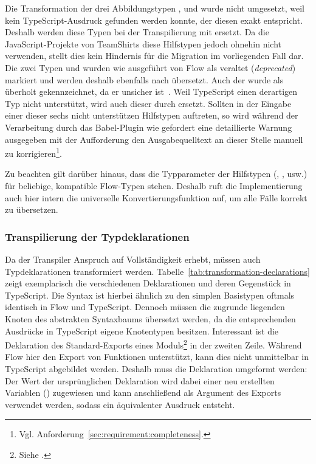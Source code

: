 Die Transformation der drei Abbildungstypen ,  und  wurde nicht umgesetzt, weil kein TypeScript-Ausdruck gefunden werden konnte, der diesen exakt entspricht. Deshalb werden diese Typen bei der Transpilierung mit  ersetzt. Da die JavaScript-Projekte von TeamShirts diese Hilfstypen jedoch ohnehin nicht verwenden, stellt dies kein Hindernis für die Migration im vorliegenden Fall dar. Die zwei Typen  und  wurden wie ausgeführt von Flow als veraltet (\textit{deprecated}) markiert und werden deshalb ebenfalls nach  übersetzt. Auch der  wurde als überholt gekennzeichnet, da er unsicher ist~\autocite{FLOW:LINT_RULE_REFERENCE}. Weil TypeScript einen derartigen Typ nicht unterstützt, wird auch dieser durch  ersetzt. Sollten in der Eingabe einer dieser sechs nicht unterstützen Hilfstypen auftreten, so wird während der Verarbeitung durch das Babel-Plugin wie gefordert eine detaillierte Warnung ausgegeben mit der Aufforderung den Ausgabequelltext an dieser Stelle manuell zu korrigieren\footnote{Vgl. Anforderung~\ref{sec:requirement:completeness}.}.

Zu beachten gilt darüber hinaus, dass die Typparameter der Hilfstypen (, ,  usw.) für beliebige, kompatible Flow-Typen stehen. Deshalb ruft die Implementierung auch hier intern die universelle Konvertierungsfunktion  auf, um alle Fälle korrekt zu übersetzen.

\subsubsection{Transpilierung der Typdeklarationen}

Da der Transpiler Anspruch auf Vollständigkeit erhebt, müssen auch Typdeklarationen transformiert werden. Tabelle~\ref{tab:transformation-declarations} zeigt exemplarisch die verschiedenen Deklarationen und deren Gegenstück in TypeScript. Die Syntax ist hierbei ähnlich zu den simplen Basistypen oftmals identisch in Flow und TypeScript. Dennoch müssen die zugrunde liegenden Knoten des abstrakten Syntaxbaums übersetzt werden, da die entsprechenden Ausdrücke in TypeScript eigene Knotentypen besitzen. Interessant ist die Deklaration des Standard-Exports eines Moduls\footnote{Siehe \autocite[377]{ECMASCRIPT:2019}.} in der zweiten Zeile. Während Flow hier den Export von Funktionen unterstützt, kann dies nicht unmittelbar in TypeScript abgebildet werden. Deshalb muss die Deklaration umgeformt werden: Der Wert der ursprünglichen Deklaration wird dabei einer neu erstellten Variablen () zugewiesen und kann anschließend als Argument des Exports verwendet werden, sodass ein äquivalenter Ausdruck entsteht.

